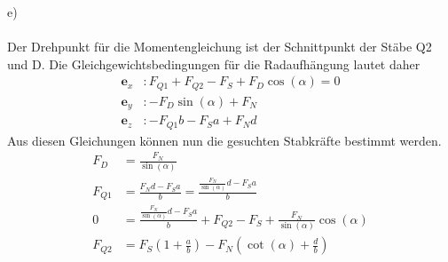 \newline
e)\\ \\
Der Drehpunkt für die Momentengleichung ist der Schnittpunkt der Stäbe Q2 und D. Die Gleichgewichtsbedingungen für die Radaufhängung lautet daher
\begin{align*}
	\textbf{e}_x &: F_{Q1} + F_{Q2} - F_S + F_D\cos(\alpha) = 0\\
	\textbf{e}_y &: -F_D\sin(\alpha) + F_N\\
	\textbf{e}_z &: -F_{Q1}b - F_Sa + F_Nd
\end{align*}
\newpage
\noindent
Aus diesen Gleichungen können nun die gesuchten Stabkräfte bestimmt werden.
\begin{align*}
	F_D &= \frac{F_N}{\sin(\alpha)} \\
	F_{Q1} &= \frac{F_Nd - F_Sa}{b} = \frac{\frac{F_N}{\sin(\alpha)}d - F_Sa}{b} \\
	0 &= \frac{\frac{F_N}{\sin(\alpha)}d - F_Sa}{b} + F_{Q2} - F_S + \frac{F_N}{\sin(\alpha)}\cos(\alpha) \\
	F_{Q2} &= F_S\left(1 + \frac{a}{b}\right) - F_N\left(\cot(\alpha) + \frac{d}{b}\right)
\end{align*}